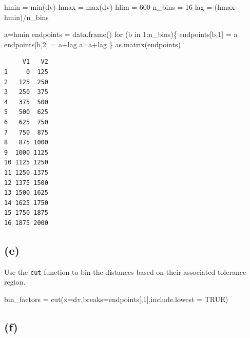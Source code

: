 \documentclass[
  letterpaper,
  DIV=11,
  numbers=noendperiod]{scrartcl}
\newenvironment{Shaded}{\begin{snugshade}}{\end{snugshade}}
\newcommand{\AttributeTok}[1]{\textcolor[rgb]{0.40,0.45,0.13}{#1}}
\newcommand{\ConstantTok}[1]{\textcolor[rgb]{0.56,0.35,0.01}{#1}}
\newcommand{\ControlFlowTok}[1]{\textcolor[rgb]{0.00,0.23,0.31}{#1}}
\newcommand{\DecValTok}[1]{\textcolor[rgb]{0.68,0.00,0.00}{#1}}
\newcommand{\FunctionTok}[1]{\textcolor[rgb]{0.28,0.35,0.67}{#1}}
\newcommand{\NormalTok}[1]{\textcolor[rgb]{0.00,0.23,0.31}{#1}}
\newcommand{\OtherTok}[1]{\textcolor[rgb]{0.00,0.23,0.31}{#1}}
\newcommand{\SpecialCharTok}[1]{\textcolor[rgb]{0.37,0.37,0.37}{#1}}
\begin{document}
\begin{Shaded}
\begin{Highlighting}[]
\NormalTok{hmin }\OtherTok{=} \FunctionTok{min}\NormalTok{(dv)}
\NormalTok{hmax }\OtherTok{=} \FunctionTok{max}\NormalTok{(dv)}
\NormalTok{hlim }\OtherTok{=} \DecValTok{600}
\NormalTok{n\_bins }\OtherTok{=} \DecValTok{16}
\NormalTok{lag }\OtherTok{=}\NormalTok{ (hmax}\SpecialCharTok{{-}}\NormalTok{hmin)}\SpecialCharTok{/}\NormalTok{n\_bins}

\NormalTok{a}\OtherTok{=}\NormalTok{hmin}
\NormalTok{endpoints }\OtherTok{=} \FunctionTok{data.frame}\NormalTok{()}
\ControlFlowTok{for}\NormalTok{ (b }\ControlFlowTok{in} \DecValTok{1}\SpecialCharTok{:}\NormalTok{n\_bins)\{}
\NormalTok{  endpoints[b,}\DecValTok{1}\NormalTok{] }\OtherTok{=}\NormalTok{ a}
\NormalTok{  endpoints[b,}\DecValTok{2}\NormalTok{] }\OtherTok{=}\NormalTok{ a}\SpecialCharTok{+}\NormalTok{lag}
\NormalTok{  a}\OtherTok{=}\NormalTok{a}\SpecialCharTok{+}\NormalTok{lag}
\NormalTok{\}}
\FunctionTok{as.matrix}\NormalTok{(endpoints)}
\end{Highlighting}
\end{Shaded}

\begin{verbatim}
     V1   V2
1     0  125
2   125  250
3   250  375
4   375  500
5   500  625
6   625  750
7   750  875
8   875 1000
9  1000 1125
10 1125 1250
11 1250 1375
12 1375 1500
13 1500 1625
14 1625 1750
15 1750 1875
16 1875 2000
\end{verbatim}

\hypertarget{e-1}{%
\subsection{(e)}\label{e-1}}

Use the \texttt{cut} function to bin the distances based on their
associated tolerance region.

\begin{Shaded}
\begin{Highlighting}[]
\NormalTok{bin\_factors }\OtherTok{=} \FunctionTok{cut}\NormalTok{(}\AttributeTok{x=}\NormalTok{dv,}\AttributeTok{breaks=}\NormalTok{endpoints[,}\DecValTok{1}\NormalTok{],}\AttributeTok{include.lowest =} \ConstantTok{TRUE}\NormalTok{)}
\end{Highlighting}
\end{Shaded}

\hypertarget{f}{%
\subsection{(f)}\label{f}}
\end{document}
